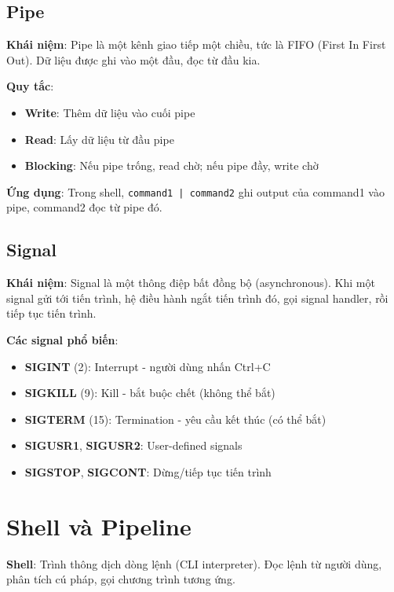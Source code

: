 \subsection{Pipe}

\textbf{Khái niệm}: Pipe là một kênh giao tiếp một chiều, tức là FIFO (First In First Out). 
Dữ liệu được ghi vào một đầu, đọc từ đầu kia.

\textbf{Quy tắc}:
\begin{itemize}[leftmargin=1.5cm]
  \item \textbf{Write}: Thêm dữ liệu vào cuối pipe
  \item \textbf{Read}: Lấy dữ liệu từ đầu pipe
  \item \textbf{Blocking}: Nếu pipe trống, read chờ; nếu pipe đầy, write chờ
\end{itemize}

\textbf{Ứng dụng}: Trong shell, \texttt{command1 | command2} ghi output của command1 vào pipe, 
command2 đọc từ pipe đó.

\subsection{Signal}

\textbf{Khái niệm}: Signal là một thông điệp bất đồng bộ (asynchronous). 
Khi một signal gửi tới tiến trình, hệ điều hành ngắt tiến trình đó, 
gọi signal handler, rồi tiếp tục tiến trình.

\textbf{Các signal phổ biến}:
\begin{itemize}[leftmargin=1.5cm]
  \item \textbf{SIGINT} (2): Interrupt - người dùng nhấn Ctrl+C
  \item \textbf{SIGKILL} (9): Kill - bắt buộc chết (không thể bắt)
  \item \textbf{SIGTERM} (15): Termination - yêu cầu kết thúc (có thể bắt)
  \item \textbf{SIGUSR1}, \textbf{SIGUSR2}: User-defined signals
  \item \textbf{SIGSTOP}, \textbf{SIGCONT}: Dừng/tiếp tục tiến trình
\end{itemize}

\section{Shell và Pipeline}

\textbf{Shell}: Trình thông dịch dòng lệnh (CLI interpreter). Đọc lệnh từ người dùng, 
phân tích cú pháp, gọi chương trình tương ứng.

